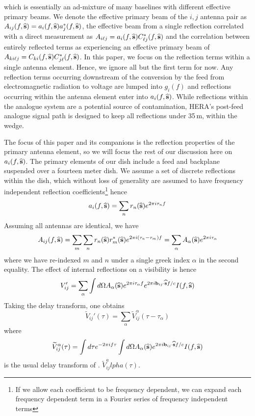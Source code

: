 \documentclass[twocolumn]{emulateapj}
\begin{document}
which is essentially an ad-mixture of many baselines with different effective primary beams. We denote the effective primary beam of the $i,j$ antenna pair as $A_{ij}(f,{\bf \widehat{s}})=a_i(f,{\bf \widehat{s}})a_j^*(f,{\bf \widehat{s}})$, the effective beam from a single reflection correlated with a direct measurement as $A_{i \ell j} = a_i(f,{\bf \widehat{s}}) C^*_{\ell j}(f,{\bf \widehat{s}})$ and the correlation between entirely reflected terms as experiencing an effective primary beam of $A_{k i \ell j}=C_{ki}(f,{\bf \widehat{s}}) C^*_{j \ell}(f,{\bf \widehat{s}})$. In this paper, we focus on the reflection terms within a single antenna element. Hence, we ignore all but the first term for now. Any reflection terms occurring downstream of the conversion by the feed from electromagnetic radiation to voltage are lumped into $g_i(f)$ and reflections occurring within the antenna element enter into $a_i(f,{\bf \widehat{s}})$. While reflections within the analogue system are a potential source of contamination, HERA's post-feed analogue signal path is designed to keep all reflections under 35\,m, within the wedge. 

The focus of this paper and its companions is the reflection properties of the primary antenna element, so we will focus the rest of our discussion here on $a_i(f,{\bf \widehat{s}})$. The primary elements of our dish include a feed and backplane suspended over a fourteen meter dish. We assume a set of discrete reflections within the dish, which without loss of generality are assumed to have frequency independent reflection coefficients\footnote{If we allow each coefficient to be frequency dependent, we can expand each frequency dependent term in a Fourier series of frequency independent terms} hence 
\begin{equation}
a_i(f,{\bf \widehat{s}}) = \sum_{n} r_n({\bf \widehat{s}}) e^{2 \pi i  \tau_n f}
\end{equation}
Assuming all antennas are identical, we have
\begin{equation}
A_{ij}(f,{\bf \widehat{s}}) = \sum_m \sum_n r_n({\bf \widehat{s}}) r_m^*({\bf \widehat{s}}) e^{2 \pi i(\tau_n-\tau_m)f} = \sum_\alpha A_\alpha({\bf \widehat{s}}) e^{2 \pi i \tau_\alpha}
\end{equation}
where we have re-indexed $m$ and $n$ under a single greek index $\alpha$ in the second equality. The effect of internal reflections on a visibility is hence
\begin{equation}
V_{ij}'= \sum_\alpha \int d \Omega A_\alpha({\bf \widehat{s}}) e^{2 \pi i \tau_\alpha f} e^{2 \pi i {\bf b}_{ij} \cdot {\bf \widehat{s}}f/c} I(f,{\bf \widehat{s}})
\end{equation}
Taking the delay transform, one obtains
\begin{equation}
\widetilde{V}_{ij}'(\tau) = \sum_\alpha \widetilde{V}_{ij}^\alpha (\tau - \tau_\alpha)
\end{equation}
where 
\begin{equation}
\widetilde{V}^\alpha_{ij}(\tau) = \int d \tau e^{-2 \pi i f \tau} \int d \Omega A_\alpha({\bf \widehat{s}}) e^{2 \pi i {\bf b}_{ij} \cdot {\bf \widehat{s}} f/c} I(f,{\bf \widehat{s}})
\end{equation}
is the usual delay transform of \citet{Parsons:2012}. $\widetilde{V}_{ij}^alpha(\tau)$.
\end{document}
